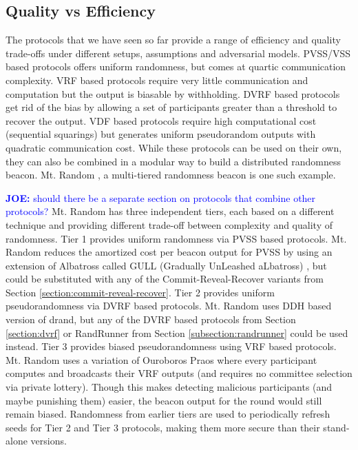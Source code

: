 \documentclass[letterpaper,twocolumn,10pt]{article}
\theoremstyle{definition}
\theoremstyle{remark}
\newcommand{\joenote}[1]{\textcolor{blue}{\textbf{JOE:} #1}}
\begin{document}
\subsection{Quality vs Efficiency}
The protocols that we have seen so far provide a range of efficiency and quality trade-offs under different setups, assumptions and adversarial models. PVSS/VSS based protocols offers uniform randomness, but comes at quartic communication complexity. 
VRF based protocols require very little communication and computation but the output is biasable by withholding. DVRF based protocols get rid of the bias by allowing a set of participants greater than a threshold to recover the output. VDF based protocols require high computational cost (sequential squarings) but generates uniform pseudorandom outputs with quadratic communication cost. While these protocols can be used on their own, they can also be combined in a modular way to build a distributed randomness beacon. Mt. Random \cite{cascudomt}, a multi-tiered randomness beacon is one such example.

\joenote{should there be a separate section on protocols that combine other protocols?}
Mt. Random has three independent tiers, each based on a different technique and providing different trade-off between complexity and quality of randomness. Tier 1 provides uniform randomness via PVSS based protocols. Mt. Random reduces the amortized cost per beacon output for PVSS by using an extension of Albatross called GULL (Gradually UnLeashed aLbatross) \cite{cascudomt}, but could be substituted with any of the Commit-Reveal-Recover variants from Section \ref{section:commit-reveal-recover}. Tier 2 provides uniform pseudorandomness via DVRF based protocols. Mt. Random uses DDH based version of drand, but any of the DVRF based protocols from Section \ref{section:dvrf} or RandRunner from Section \ref{subsection:randrunner} could be used instead. Tier 3 provides biased pseudorandomness using VRF based protocols. Mt. Random uses a variation of Ouroboros Praos where every participant computes and broadcasts their VRF outputs (and requires no committee selection via private lottery). Though this makes detecting malicious participants (and maybe punishing them) easier, the beacon output for the round would still remain biased. Randomness from earlier tiers are used to periodically refresh seeds for Tier 2 and Tier 3 protocols, making them more secure than their stand-alone versions.
\end{document}
